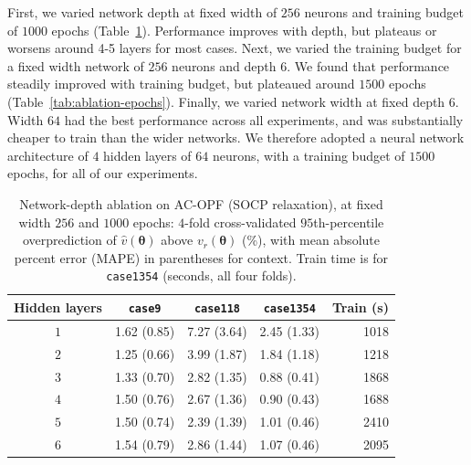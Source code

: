 \documentclass[10pt]{article} %
\theoremstyle{plain}
\theoremstyle{definition}
\theoremstyle{remark}
\begin{document}
First, we varied network depth at fixed width of $256$ neurons and training budget of $1000$ epochs (Table~\ref{tab:ablation-depth}). Performance improves with depth, but plateaus or worsens around 4-5 layers for most cases. Next, we varied the training budget for a fixed width network of $256$ neurons and depth 6. We found that performance steadily improved with training budget, but plateaued around $1500$ epochs (Table~\ref{tab:ablation-epochs}). Finally, we varied network width at fixed depth $6$. Width $64$ had the best performance across all experiments, and was substantially cheaper to train than the wider networks. We therefore adopted a neural network architecture of $4$ hidden layers of $64$ neurons, with a training budget of $1500$ epochs, for all of our experiments.

\begin{table}[h]
\centering\footnotesize
\caption{Network-depth ablation on AC-OPF (SOCP relaxation), at fixed width $256$ and $1000$ epochs: $4$-fold cross-validated $95$th-percentile overprediction of $\hat{v}(\bm{\theta})$ above $v_r(\bm{\theta})$ (\%), with mean absolute percent error (MAPE) in parentheses for context. Train time is for \texttt{case1354} (seconds, all four folds).}
\label{tab:ablation-depth}
\begin{tabular}{c ccc r}
\toprule
\textbf{Hidden layers} & \texttt{case9} & \texttt{case118} & \texttt{case1354} & \textbf{Train (s)} \\
\midrule
  $1$ & 1.62 (0.85) & 7.27 (3.64) & 2.45 (1.33) & 1018 \\
  $2$ & 1.25 (0.66) & 3.99 (1.87) & 1.84 (1.18) & 1218 \\
  $3$ & 1.33 (0.70) & 2.82 (1.35) & 0.88 (0.41) & 1868 \\
  $4$ & 1.50 (0.76) & 2.67 (1.36) & 0.90 (0.43) & 1688 \\
  $5$ & 1.50 (0.74) & 2.39 (1.39) & 1.01 (0.46) & 2410 \\
  $6$ & 1.54 (0.79) & 2.86 (1.44) & 1.07 (0.46) & 2095 \\
\bottomrule
\end{tabular}
\end{table}
\end{document}
